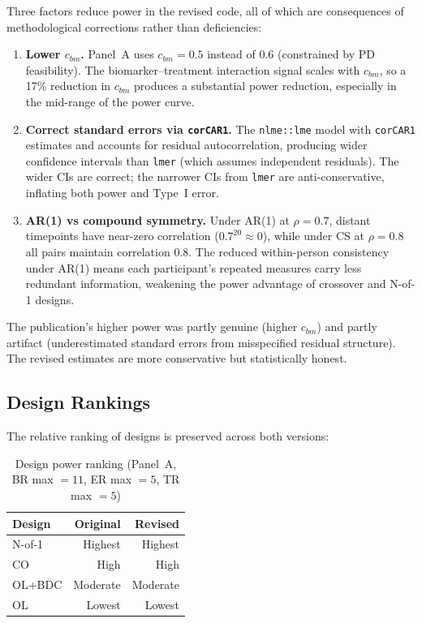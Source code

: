 \documentclass[11pt]{article}
\begin{document}
Three factors reduce power in the revised code, all of
which are consequences of methodological corrections rather
than deficiencies:

\begin{enumerate}
\item \textbf{Lower $c_{bm}$.} Panel~A uses $c_{bm} = 0.5$
  instead of 0.6 (constrained by PD feasibility). The
  biomarker--treatment interaction signal scales with
  $c_{bm}$, so a 17\% reduction in $c_{bm}$ produces a
  substantial power reduction, especially in the mid-range
  of the power curve.

\item \textbf{Correct standard errors via \texttt{corCAR1}.}
  The \texttt{nlme::lme} model with \texttt{corCAR1}
  estimates and accounts for residual autocorrelation,
  producing wider confidence intervals than \texttt{lmer}
  (which assumes independent residuals). The wider CIs are
  correct; the narrower CIs from \texttt{lmer} are
  anti-conservative, inflating both power and Type~I error.

\item \textbf{AR(1) vs compound symmetry.} Under AR(1) at
  $\rho = 0.7$, distant timepoints have near-zero
  correlation ($0.7^{20} \approx 0$), while under CS at
  $\rho = 0.8$ all pairs maintain correlation 0.8. The
  reduced within-person consistency under AR(1) means each
  participant's repeated measures carry less redundant
  information, weakening the power advantage of crossover
  and N-of-1 designs.
\end{enumerate}

The publication's higher power was partly genuine (higher
$c_{bm}$) and partly artifact (underestimated standard
errors from misspecified residual structure). The revised
estimates are more conservative but statistically honest.

\subsection{Design Rankings}

The relative ranking of designs is preserved across both
versions:

\begin{table}[h]
\centering
\caption{Design power ranking (Panel~A, BR max $= 11$,
  ER max $= 5$, TR max $= 5$)}
\begin{tabular}{lrr}
\toprule
Design & Original & Revised \\
\midrule
N-of-1 & Highest & Highest \\
CO & High & High \\
OL+BDC & Moderate & Moderate \\
OL & Lowest & Lowest \\
\bottomrule
\end{tabular}
\end{table}
\end{document}
